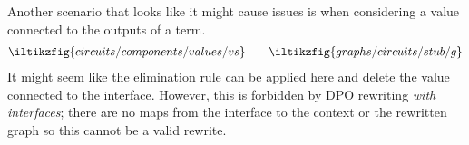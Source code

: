 \begin{remark}
    Another scenario that looks like it might cause issues is when considering
    a value connected to the outputs of a term.
    \begin{gather*}
        \iltikzfig{circuits/components/values/vs}
        \qquad
        \iltikzfig{graphs/circuits/stub/g}
    \end{gather*}
    It might seem like the elimination rule can be applied here and delete the
    value connected to the interface.
    However, this is forbidden by DPO rewriting \emph{with interfaces}; there
    are no maps from the interface to the context or the rewritten graph so this
    cannot be a valid rewrite.
    \begin{center}
        
    \end{center}
\end{remark}